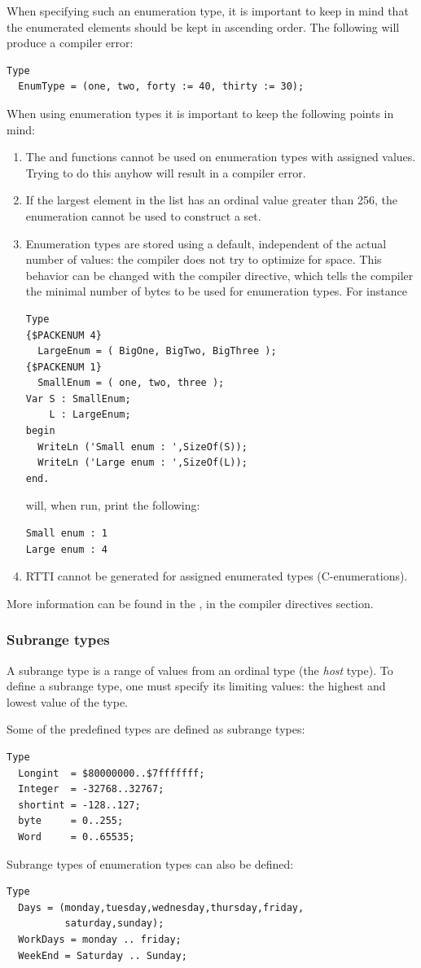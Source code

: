 When specifying such an enumeration type, it is important to keep in mind
that the enumerated elements should be kept in ascending order. The
following will produce a compiler error:
\begin{verbatim}
Type
  EnumType = (one, two, forty := 40, thirty := 30);
\end{verbatim}

When using enumeration types it is important to keep the following points
in mind:
\begin{enumerate}
\item The  and  functions cannot be used on
enumeration types with assigned values. Trying to do this anyhow will result in a
compiler error.
\item If the largest element in the list has an ordinal value greater than
256, the enumeration cannot be used to construct a set.
\item Enumeration types are stored using a default, independent of the
actual number of values: the compiler does not try to optimize for space.
This behavior can be changed with the  compiler
directive, which tells the compiler the minimal number of bytes to be
used for enumeration types.
For instance
\begin{verbatim}
Type
{$PACKENUM 4}
  LargeEnum = ( BigOne, BigTwo, BigThree );
{$PACKENUM 1}
  SmallEnum = ( one, two, three );
Var S : SmallEnum;
    L : LargeEnum;
begin
  WriteLn ('Small enum : ',SizeOf(S));
  WriteLn ('Large enum : ',SizeOf(L));
end.
\end{verbatim}
will, when run, print the following:
\begin{verbatim}
Small enum : 1
Large enum : 4
\end{verbatim}
\item RTTI cannot be generated for assigned enumerated types (C-enumerations).
\end{enumerate}
More information can be found in the \progref, in the compiler directives
section.
%
%
\subsubsection{Subrange types}
A subrange type is a range of values from an ordinal type (the {\em host}
type). To define a subrange type, one must specify its limiting values:
the highest and lowest value of the type.

Some of the predefined  types are defined as subrange types:
\begin{verbatim}
Type
  Longint  = $80000000..$7fffffff;
  Integer  = -32768..32767;
  shortint = -128..127;
  byte     = 0..255;
  Word     = 0..65535;
\end{verbatim}
Subrange types of enumeration types can also be defined:
\begin{verbatim}
Type
  Days = (monday,tuesday,wednesday,thursday,friday,
          saturday,sunday);
  WorkDays = monday .. friday;
  WeekEnd = Saturday .. Sunday;
\end{verbatim}

